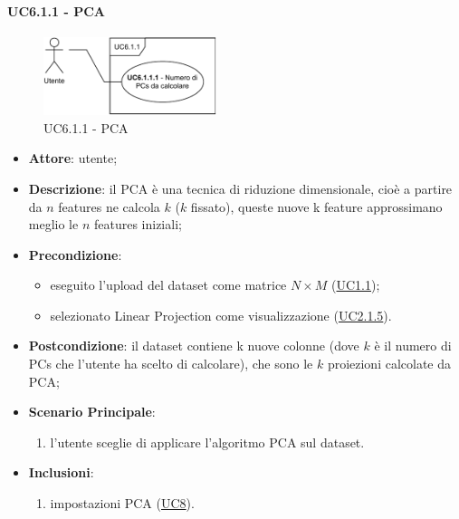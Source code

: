     \paragraph{UC6.1.1 - PCA}
    \label{uc6.1.1}
        \begin{figure}[htbp]
        \centering
        \includegraphics[width=0.45\textwidth]{source/sections/casi-uso/diagrams/uc6_1_1.pdf}
        \caption{UC6.1.1 - PCA}
        \label{fig:uc6.1.1}
    \end{figure}
    \begin{itemize}
    \item \textbf{Attore}: utente;
    \item \textbf{Descrizione}: il PCA è una tecnica di riduzione dimensionale, cioè a partire da $n$ features ne calcola $k$ ($k$ fissato), queste nuove k feature approssimano meglio le $n$ features iniziali;
    \item \textbf{Precondizione}: 
    \begin{itemize}
        \item eseguito l'upload del dataset come matrice $N\times M$ (\hyperref[uc1.1]{UC1.1});
        \item selezionato Linear Projection come visualizzazione (\hyperref[uc2.1.5]{UC2.1.5}).
    \end{itemize}  
    \item \textbf{Postcondizione}: il dataset contiene k nuove colonne (dove $k$ è il numero di PCs che l'utente ha scelto di calcolare), che sono le $k$ proiezioni calcolate da PCA;
    \item \textbf{Scenario Principale}: 
    \begin{enumerate}
        \item l'utente sceglie di applicare l'algoritmo PCA sul dataset.
    \end{enumerate}  
    \item \textbf{Inclusioni}:
        \begin{enumerate}
            \item impostazioni PCA (\hyperref[uc8]{UC8}).
        \end{enumerate} 
    \end{itemize}
    
